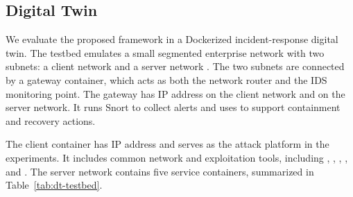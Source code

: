 \documentclass[sigconf]{acmart}
\begin{document}
  \begin{table}[!ht]
      \caption{A summary of LoRA fine-tuning hyperparameters.}
      \label{tab:lora}
  \end{table}

\subsection{Digital Twin}

  We evaluate the proposed framework in a Dockerized incident-response digital
  twin. The testbed emulates a small segmented enterprise network with two
  subnets: a client network  and a server network
  . The two subnets are connected by a gateway container, which
  acts as both the network router and the IDS monitoring point. The gateway has
  IP address  on the client network and  on the
  server network. It runs Snort to collect alerts and uses  to
  support containment and recovery actions.

  The client container has IP address  and serves as the attack
  platform in the experiments. It includes common network and exploitation tools,
  including , , , , and
  . The server network contains five service containers, summarized
  in Table~\ref{tab:dt-testbed}.
\end{document}
